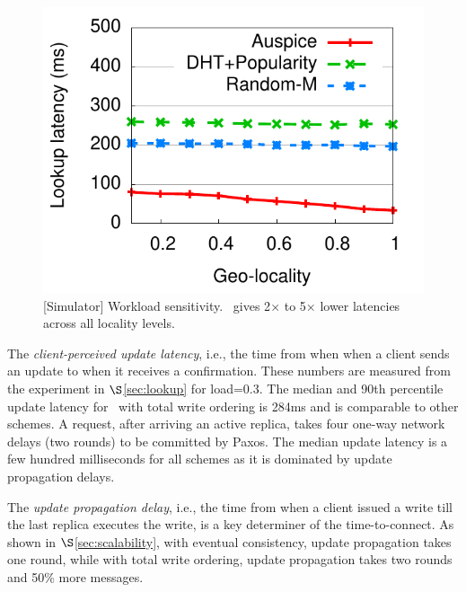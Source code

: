 {\begin{figure}[t]
\includegraphics[scale=0.5]{graph/medianlatencyVSlocality.pdf}
\vspace{-0.1in}
\caption{[Simulator] Workload sensitivity. \auspice\ gives 2$\times$ to 5$\times$  lower latencies across all locality levels.}
\label{fig:varylocality}
\vspace{-0.1in}
\end{figure}

}



The {\em client-perceived update latency}, i.e., the time from when when a client sends an update to when it receives a confirmation. %
These numbers are measured from the experiment in $\S$\ref{sec:lookup} for load=0.3. The median and 90th percentile update latency for \auspice\ with total write ordering is 284ms and is comparable to other schemes. A request, after arriving an active replica, takes four one-way network delays (two rounds) to be committed by Paxos. The median update latency is a few hundred milliseconds for all schemes as it is dominated by update propagation delays.

The {\em update propagation delay}, i.e., the time from when a client issued a write till the last replica executes the write, is a key determiner of the time-to-connect. As shown in $\S$\ref{sec:scalability}, with eventual consistency, update propagation takes one round, while with total write ordering, update propagation takes two rounds and 50\% more messages.

